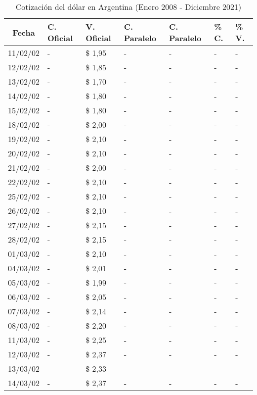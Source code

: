 \begin{center}
\begin{longtable}{|c|p{1.5cm}|p{1.5cm}|p{1.5cm}|p{1.5cm}|p{1.5cm}|p{1.5cm}|}
\caption{Cotización del dólar en Argentina (Enero 2008 - Diciembre 2021)}
\label{tab:cotizacion-dolar-peso}\\
\hline 
\textbf{Fecha} & \textbf{C. Oficial} & \textbf{V. Oficial} & \textbf{C. Paralelo} & \textbf{C. Paralelo} & \textbf{\% C.} & \textbf{\% V.}  \\ \hline
11/02/02 & - & \$ 1,95 & - & - & - & - \\ \hline
12/02/02 & - & \$ 1,85 & - & - & - & - \\ \hline
13/02/02 & - & \$ 1,70 & - & - & - & - \\ \hline
14/02/02 & - & \$ 1,80 & - & - & - & - \\ \hline
15/02/02 & - & \$ 1,80 & - & - & - & - \\ \hline
18/02/02 & - & \$ 2,00 & - & - & - & - \\ \hline
19/02/02 & - & \$ 2,10 & - & - & - & - \\ \hline
20/02/02 & - & \$ 2,10 & - & - & - & - \\ \hline
21/02/02 & - & \$ 2,00 & - & - & - & - \\ \hline
22/02/02 & - & \$ 2,10 & - & - & - & - \\ \hline
25/02/02 & - & \$ 2,10 & - & - & - & - \\ \hline
26/02/02 & - & \$ 2,10 & - & - & - & - \\ \hline
27/02/02 & - & \$ 2,15 & - & - & - & - \\ \hline
28/02/02 & - & \$ 2,15 & - & - & - & - \\ \hline
01/03/02 & - & \$ 2,10 & - & - & - & - \\ \hline
04/03/02 & - & \$ 2,01 & - & - & - & - \\ \hline
05/03/02 & - & \$ 1,99 & - & - & - & - \\ \hline
06/03/02 & - & \$ 2,05 & - & - & - & - \\ \hline
07/03/02 & - & \$ 2,14 & - & - & - & - \\ \hline
08/03/02 & - & \$ 2,20 & - & - & - & - \\ \hline
11/03/02 & - & \$ 2,25 & - & - & - & - \\ \hline
12/03/02 & - & \$ 2,37 & - & - & - & - \\ \hline
13/03/02 & - & \$ 2,33 & - & - & - & - \\ \hline
14/03/02 & - & \$ 2,37 & - & - & - & - \\ \hline

\end{longtable}
\end{center}
